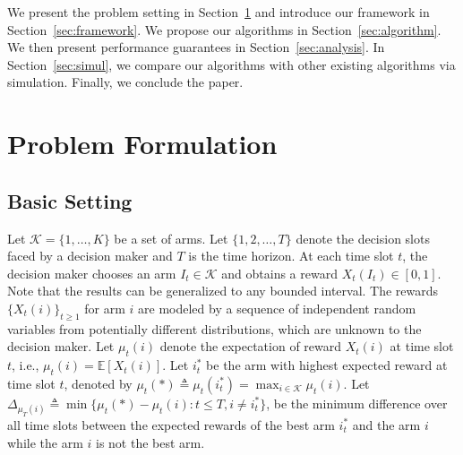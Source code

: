 \documentclass[letterpaper]{article} %
\begin{document}
We present the problem setting in Section~\ref{sec:problemform} and introduce our framework in Section~\ref{sec:framework}. We propose our algorithms in Section~\ref{sec:algorithm}. We then present performance guarantees in Section~\ref{sec:analysis}. In Section~\ref{sec:simul}, we compare our algorithms with other existing algorithms via simulation. Finally, we conclude the paper. %
\section{Problem Formulation}\label{sec:problemform}
\subsection{Basic Setting}
Let $\mathcal{K}=\{1,\ldots,K\}$ be a set of arms. Let $\{1,2,\ldots,T\}$ denote the decision slots faced by a decision maker and $T$ is the time horizon. At each time slot $t$, the decision maker chooses an arm $I_t\in\mathcal{K}$ and obtains a reward $X_t(I_t)\in[0,1]$. Note that the results can be generalized to any bounded interval. The rewards $\{X_t(i)\}_{t\geq1}$ for arm $i$ are modeled by a sequence of independent random variables from potentially different distributions, which are unknown to the decision maker.
Let $\mu_t(i)$ denote the expectation of reward $X_t(i)$ at time slot $t$, i.e., $\mu_t(i)=\mathbb{E}[X_t(i)]$. Let $i^*_t$ be the arm with highest expected reward at time slot $t$, denoted by $\mu_t(*)\triangleq\mu_t(i^*_t)=\max_{i\in\mathcal{K}}\mu_t(i)$.
Let $\Delta_{\mu_T(i)}\triangleq\min\{\mu_t(*)-\mu_t(i):t\leq T, i\neq i^*_t\}$, be the minimum difference over all time slots between the expected rewards of the best arm $i^*_t$ and the arm $i$ while the arm $i$ is not the best arm. %
\end{document}
